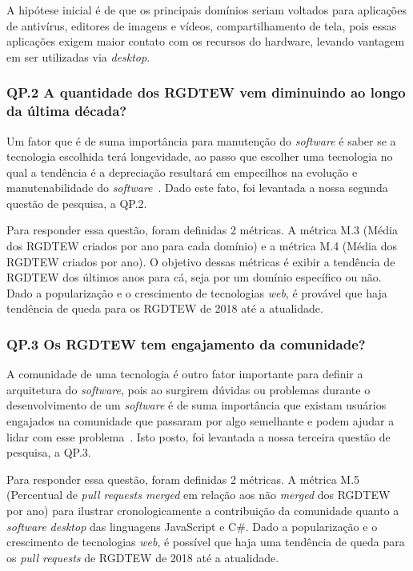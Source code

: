 \documentclass[12pt]{article}
\begin{document}
A hipótese inicial é de que os principais domínios seriam voltados para aplicações de antivírus, editores de imagens e vídeos, compartilhamento de tela, pois essas aplicações exigem maior contato com os recursos do hardware, levando vantagem em ser utilizadas via \textit{desktop}.

\subsubsection{ QP.2 A quantidade dos RGDTEW vem diminuindo ao longo da última década? }

Um fator que é de suma importância para manutenção do \textit{software} é saber se a tecnologia escolhida terá longevidade, ao passo que escolher uma tecnologia no qual a tendência é a depreciação resultará em empecilhos na evolução e manutenabilidade do \textit{software}~\cite{7965364}. Dado este fato, foi levantada a nossa segunda questão de pesquisa, a QP.2.

Para responder essa questão, foram definidas 2 métricas. A métrica M.3 (Média dos RGDTEW criados por ano para cada domínio) e a métrica M.4 (Média dos RGDTEW criados por ano). O objetivo dessas métricas é exibir a tendência de RGDTEW dos últimos anos para cá, seja por um domínio específico ou não. Dado a popularização e o crescimento de tecnologias \textit{web}, é provável que haja tendência de queda para os RGDTEW de 2018 até a atualidade.

\subsubsection{QP.3 Os RGDTEW tem engajamento da comunidade?}

A comunidade de uma tecnologia é outro fator importante para definir a arquitetura do \textit{software}, pois ao surgirem dúvidas ou problemas durante o desenvolvimento de um \textit{software} é de suma importância que existam usuários engajados na comunidade que passaram por algo semelhante e podem ajudar a lidar com esse problema~\cite{9282287}. Isto posto, foi levantada a nossa terceira questão de pesquisa, a QP.3.
 
Para responder essa questão, foram definidas 2 métricas. A métrica M.5 (Percentual de \textit{pull requests merged} em relação aos não \textit{merged} dos RGDTEW por ano) para ilustrar cronologicamente a contribuição da comunidade quanto a \textit{software} \textit{desktop} das linguagens JavaScript e C\#. Dado a popularização e o crescimento de tecnologias \textit{web}, é possível que haja uma tendência de queda para os \textit{pull requests} de RGDTEW de 2018 até a atualidade. 
\end{document}
